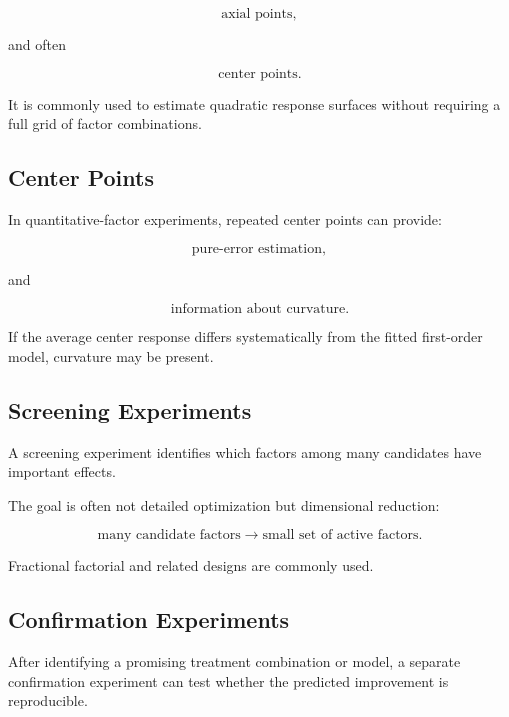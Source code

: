 \[
\boxed{
\text{axial points},
}
\]

and often

\[
\boxed{
\text{center points}.
}
\]

It is commonly used to estimate quadratic response surfaces without
requiring a full grid of factor combinations.

\subsection{Center Points}
\label{subsec:center-points}

In quantitative-factor experiments, repeated center points can provide:

\[
\boxed{
\text{pure-error estimation},
}
\]

and

\[
\boxed{
\text{information about curvature}.
}
\]

If the average center response differs systematically from the fitted
first-order model, curvature may be present.

\subsection{Screening Experiments}
\label{subsec:screening-experiments}

A screening experiment identifies which factors among many candidates
have important effects.

The goal is often not detailed optimization but dimensional reduction:

\[
\boxed{
\text{many candidate factors}
\longrightarrow
\text{small set of active factors}.
}
\]

Fractional factorial and related designs are commonly used.

\subsection{Confirmation Experiments}
\label{subsec:confirmation-experiments}

After identifying a promising treatment combination or model, a separate
confirmation experiment can test whether the predicted improvement is
reproducible.

